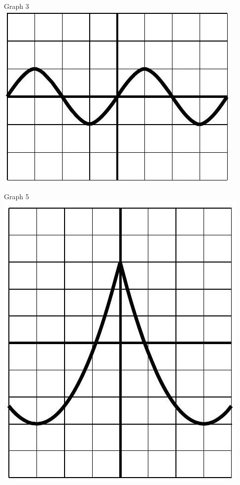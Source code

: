 \documentclass[10pt]{article}
\begin{document}
Graph 3\\
\includegraphics[max width=\textwidth, center]{2024_12_26_08a12fb3da5425a27925g-5(6)}

Graph 5\\
\includegraphics[max width=\textwidth, center]{2024_12_26_08a12fb3da5425a27925g-5(5)}
\end{document}

